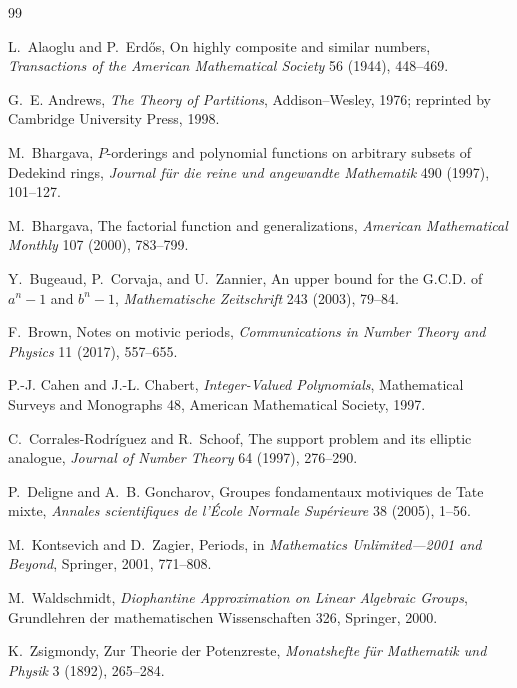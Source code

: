 \documentclass[11pt]{article}
\theoremstyle{definition}
\theoremstyle{remark}
\begin{document}
\begin{thebibliography}{99}

L.~Alaoglu and P.~Erd\H{o}s,
\newblock On highly composite and similar numbers,
\newblock \emph{Transactions of the American Mathematical Society} 56 (1944),
448--469.

G.~E. Andrews,
\newblock \emph{The Theory of Partitions},
\newblock Addison--Wesley, 1976; reprinted by Cambridge University Press, 1998.

M.~Bhargava,
\newblock $P$-orderings and polynomial functions on arbitrary subsets of
Dedekind rings,
\newblock \emph{Journal f\"ur die reine und angewandte Mathematik} 490 (1997),
101--127.

M.~Bhargava,
\newblock The factorial function and generalizations,
\newblock \emph{American Mathematical Monthly} 107 (2000), 783--799.

Y.~Bugeaud, P.~Corvaja, and U.~Zannier,
\newblock An upper bound for the G.C.D. of $a^n-1$ and $b^n-1$,
\newblock \emph{Mathematische Zeitschrift} 243 (2003), 79--84.

F.~Brown,
\newblock Notes on motivic periods,
\newblock \emph{Communications in Number Theory and Physics} 11 (2017),
557--655.

P.-J. Cahen and J.-L. Chabert,
\newblock \emph{Integer-Valued Polynomials},
\newblock Mathematical Surveys and Monographs 48, American Mathematical
Society, 1997.

C.~Corrales-Rodr\'{i}guez and R.~Schoof,
\newblock The support problem and its elliptic analogue,
\newblock \emph{Journal of Number Theory} 64 (1997), 276--290.

P.~Deligne and A.~B. Goncharov,
\newblock Groupes fondamentaux motiviques de Tate mixte,
\newblock \emph{Annales scientifiques de l'\'Ecole Normale Sup\'erieure}
38 (2005), 1--56.

M.~Kontsevich and D.~Zagier,
\newblock Periods,
\newblock in \emph{Mathematics Unlimited---2001 and Beyond}, Springer, 2001,
771--808.

M.~Waldschmidt,
\newblock \emph{Diophantine Approximation on Linear Algebraic Groups},
\newblock Grundlehren der mathematischen Wissenschaften 326, Springer, 2000.

K.~Zsigmondy,
\newblock Zur Theorie der Potenzreste,
\newblock \emph{Monatshefte f\"ur Mathematik und Physik} 3 (1892), 265--284.

\end{thebibliography}
\end{document}
